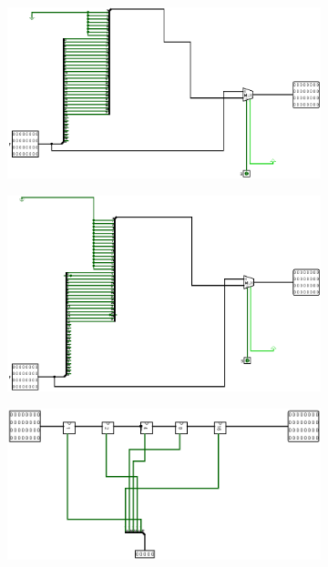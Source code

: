 \documentclass[a4paper,12pt]{article}
\begin{document}
\begin{figure}[H]
    \begin{subfigure}[b]{0.3\textwidth}
        \centering
        \includegraphics[width=\linewidth]{8 bit leftShifter.png}
    \end{subfigure}
    \hfill
    \begin{subfigure}[b]{0.3\textwidth}
        \centering
        \includegraphics[width=\linewidth]{16 bit leftShifter.png}
    \end{subfigure}
    \hfill
    \begin{subfigure}[b]{0.3\textwidth}
        \centering
        \includegraphics[width=\linewidth]{Arbitary leftShifter.png}
    \end{subfigure}
    \newline
    \newline
    \vspace{1em}


\end{figure}
\end{document}

